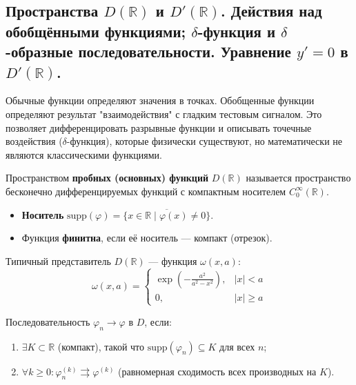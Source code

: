 
\subsection{Пространства $D(\mathbb{R})$ и $D'(\mathbb{R})$. Действия над обобщёнными функциями; $\delta$-функция и $\delta$-образные последовательности. Уравнение $y' = 0$ в $D'(\mathbb{R})$.}

\begin{idea}
	Обычные функции определяют значения в точках. Обобщенные функции определяют результат "взаимодействия" с гладким тестовым сигналом. 
	Это позволяет дифференцировать разрывные функции и описывать точечные воздействия ($\delta$-функция), которые физически существуют, но математически не являются классическими функциями.
\end{idea}

\begin{definition}
	Пространством \textbf{пробных (основных) функций} $D(\mathbb{R})$ называется пространство бесконечно дифференцируемых функций с компактным носителем $C_0^\infty(\mathbb{R})$.
	\begin{itemize}
		\item \textbf{Носитель} $\text{supp}(\varphi) = \overline{\{x \in \mathbb{R} \mid \varphi(x) \neq 0\}}$.
		\item Функция \textbf{финитна}, если её носитель --- компакт (отрезок).
	\end{itemize}
\end{definition}

\begin{example}
	Типичный представитель $D(\mathbb{R})$ --- функция $\omega(x, a)$:
	\[ \omega(x, a) = \begin{cases} \exp\left(-\frac{a^2}{a^2 - x^2}\right), & |x| < a \\ 0, & |x| \geqslant a \end{cases} \]
\end{example}

\begin{definition}[Сходимость в $D$]
	Последовательность $\varphi_n \to \varphi$ в $D$, если:
	\begin{enumerate}
		\item $\exists K \subset \mathbb{R}$ (компакт), такой что $\text{supp}(\varphi_n) \subseteq K$ для всех $n$;
		\item $\forall k \ge 0: \varphi_n^{(k)} \rightrightarrows \varphi^{(k)}$ (равномерная сходимость всех производных на $K$).
	\end{enumerate}
\end{definition}

